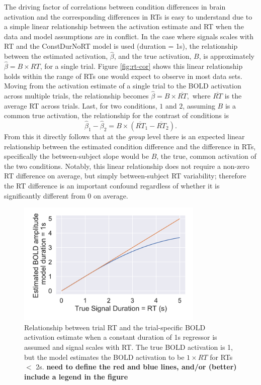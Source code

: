 \documentclass[titlepage,12pt] {article}
\begin{document}
The driving factor of correlations between condition differences in brain activation and the corresponding differences in RTs is easy to understand due to a simple linear relationship between the activation estimate and RT when the data and model assumptions are in conflict. In the case where signals scales with RT and the ConstDurNoRT model is used (duration = 1s), the relationship between the estimated activation, $\hat\beta$, and the true activation, $B$, is approximately $\hat\beta = B \times RT$, for a single trial.  Figure \ref{fig:rt-cor} shows this linear relationship holds within the range of RTs one would expect to observe in most data sets.  Moving from the activation estimate of a single trial to the BOLD activation across multiple trials, the relationship becomes $\hat\beta = B\times \overline{RT}, $ where $\overline{RT}$ is the average RT across trials.  Last, for two conditions, $1$ and $2$, assuming $B$ is a common true activation, the relationship for the contrast of conditions is $$\hat\beta_1 -\hat\beta_2 = B\times\left(\overline{RT}_1 - \overline{RT}_2\right).$$
From this it directly follows that at the \emph{group} level there is an expected linear relationship between the estimated condition difference and the difference in RTs, specifically the between-subject slope would be $B$, the true, common activation of the two conditions.  Notably, this linear relationship does not require a non-zero RT difference on average, but simply between-subject RT variability; therefore the RT difference is an important confound regardless of whether it is significantly different from 0 on average.

\begin{figure}
  \centering
   \includegraphics[width=3.5in]{Figures/bold_fcn_rt_1sdur_only.pdf}
   \caption{Relationship between trial RT and the trial-specific BOLD activation estimate when a constant duration of 1s regressor is assumed and signal scales with RT.  The true BOLD activation is 1, but the model estimates the BOLD activation to be $1\times RT$ for RTs $<$ 2s. \textbf{need to define the red and blue lines, and/or (better) include a legend in the figure}}
  \label{fig:bold_rt}
\end{figure}
\end{document}
